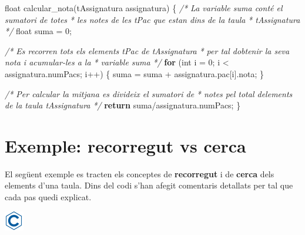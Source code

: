 \documentclass[
]{book}
\newenvironment{Shaded}{\begin{snugshade}}{\end{snugshade}}
\newcommand{\CommentTok}[1]{\textcolor[rgb]{0.56,0.35,0.01}{\textit{#1}}}
\newcommand{\ControlFlowTok}[1]{\textcolor[rgb]{0.13,0.29,0.53}{\textbf{#1}}}
\newcommand{\DataTypeTok}[1]{\textcolor[rgb]{0.13,0.29,0.53}{#1}}
\newcommand{\DecValTok}[1]{\textcolor[rgb]{0.00,0.00,0.81}{#1}}
\newcommand{\NormalTok}[1]{#1}
\begin{document}
\begin{Shaded}
\begin{Highlighting}[]
\DataTypeTok{float}\NormalTok{ calcular\_nota(tAssignatura assignatura) \{}
    \CommentTok{/* La variable suma conté el sumatori de totes}
\CommentTok{     * les notes de les tPac que estan dins de la taula}
\CommentTok{     * tAssignatura }
\CommentTok{     */}
    \DataTypeTok{float}\NormalTok{ suma = }\DecValTok{0}\NormalTok{;}

    \CommentTok{/* Es recorren tots els elements tPac de tAssignatura}
\CommentTok{     * per tal d\textquotesingle{}obtenir la seva nota i acumular{-}les a la}
\CommentTok{     * variable suma }
\CommentTok{     */}
    \ControlFlowTok{for}\NormalTok{ (}\DataTypeTok{int}\NormalTok{ i = }\DecValTok{0}\NormalTok{; i \textless{} assignatura.numPacs; i++) \{}
\NormalTok{        suma = suma + assignatura.pac[i].nota;}
\NormalTok{    \}}

    \CommentTok{/* Per calcular la mitjana es divideix el sumatori de}
\CommentTok{     * notes pel total d\textquotesingle{}elements de la taula tAssignatura }
\CommentTok{     */}
   \ControlFlowTok{return}\NormalTok{ suma/assignatura.numPacs;}
\NormalTok{\}}
\end{Highlighting}
\end{Shaded}

\hypertarget{exemple-recorregut-vs-cerca}{%
\section{Exemple: recorregut vs cerca}\label{exemple-recorregut-vs-cerca}}

El següent exemple es tracten els conceptes de \textbf{recorregut} i de \textbf{cerca} dels elements d'una taula. Dins del codi s'han afegit comentaris detallats per tal que cada pas quedi explicat.

\includegraphics{./img/c.png}
\end{document}
